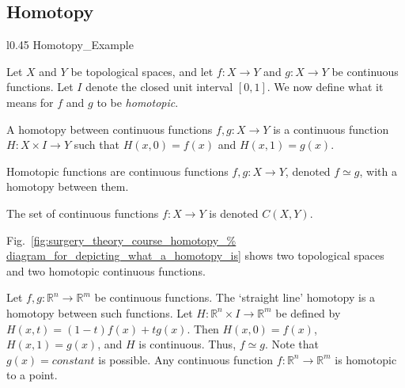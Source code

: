 \documentclass[crop=false,class=book,oneside]{standalone}
\begin{document}
        \subsection{Homotopy}
            \begin{wrapfigure}[9]{l}{0.45\textwidth}
                \centering
                \captionsetup{type=figure}
                {Homotopy_Example}
                \caption[Homotopy Diagram.]
                        {Diagram for a homotopy between two
                        functions $f,g:X\rightarrow Y$.}
                \label{fig:surgery_theory_course_homotopy_diagram_%
                       for_depicting_what_a_homotopy_is}
            \end{wrapfigure}
            Let $X$ and $Y$ be topological spaces, and let
            $f:{X}\rightarrow{Y}$ and $g:{X}\rightarrow{Y}$
            be continuous functions. Let $I$ denote the
            closed unit interval $[0,1]$.
            We now define what it means for
            $f$ and $g$ to be \textit{homotopic}.
            \begin{definition}
                A homotopy between continuous functions
                $f,g:{X}\rightarrow{Y}$ is a continuous
                function $H:{X}\times{I}\rightarrow{Y}$
                such that $H(x,0)=f(x)$ and $H(x,1)=g(x)$.
            \end{definition}
            \begin{definition}
                Homotopic functions are continuous functions
                $f,g:{X}\rightarrow{Y}$, denoted ${f}\simeq{g}$,
                with a homotopy between them.
            \end{definition}
            \begin{notation}
                The set of continuous functions
                $f:{X}\rightarrow{Y}$ is denoted $C(X,Y)$.
            \end{notation}
            Fig.~\ref{fig:surgery_theory_course_homotopy_%
                      diagram_for_depicting_what_a_homotopy_is}
            shows two topological spaces and two homotopic
            continuous functions.
            \begin{example}
                Let $f,g:\mathbb{R}^{n}\rightarrow\mathbb{R}^{m}$
                be continuous functions.
                The `straight line' homotopy is a homotopy
                between such functions. Let
                $H:\mathbb{R}^{n}\times{I}\rightarrow\mathbb{R}^{m}$
                be defined by $H(x,t)=(1-t)f(x)+tg(x)$. Then
                $H(x,0)=f(x)$, $H(x,1)=g(x)$, and
                $H$ is continuous. Thus, ${f}\simeq{g}$.
                Note that $g(x)=constant$ is possible.
                Any continuous function
                $f:\mathbb{R}^{n}\rightarrow\mathbb{R}^{m}$
                is homotopic to a point.
            \end{example}
\end{document}
